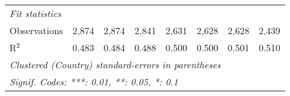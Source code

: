 \begin{tabular}{lccccccc}
   \midrule \emph{Fit statistics}\\
   Observations                                                      & 2,874         & 2,874         & 2,841         & 2,631         & 2,628         & 2,628         & 2,439\\  
   R$^2$                                                             & 0.483         & 0.484         & 0.488         & 0.500         & 0.500         & 0.501         & 0.510\\  
   \midrule
   \multicolumn{8}{l}{\emph{Clustered (Country) standard-errors in parentheses}}\\
   \multicolumn{8}{l}{\emph{Signif. Codes: ***: 0.01, **: 0.05, *: 0.1}}\\
\end{tabular}
\par\endgroup


